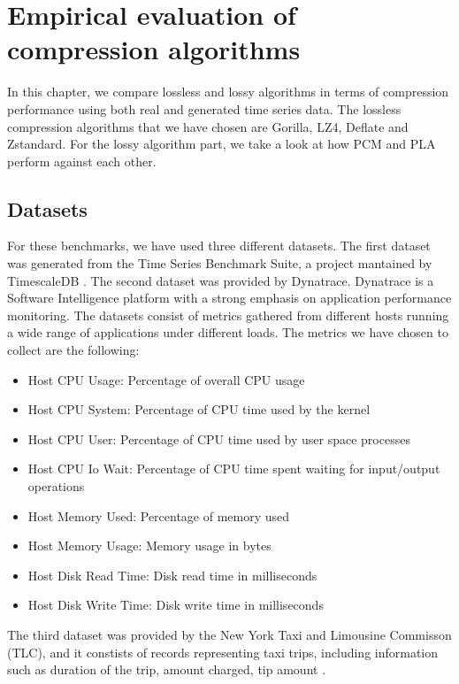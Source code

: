 \chapter{Empirical evaluation of compression algorithms}
In this chapter, we compare lossless and lossy algorithms in terms of compression performance using both real and 
generated time series data. The lossless compression algorithms that we have chosen are Gorilla, LZ4,
Deflate and Zstandard. For the lossy algorithm part, we take a look at how PCM and PLA perform against each other.

\section{Datasets}
For these benchmarks, we have used three different datasets. The first dataset was generated from the
Time Series Benchmark Suite, a project mantained by TimescaleDB \cite{timescale_2019_timescaletsbs}.
The second dataset was provided by Dynatrace. Dynatrace is a Software Intelligence platform with a strong
emphasis on application performance monitoring. The datasets consist of metrics gathered from
different hosts running a wide range of applications under different loads.
The metrics we have chosen to collect are the following:
\begin{itemize}
    \item Host CPU Usage: Percentage of overall CPU usage
    \item Host CPU System: Percentage of CPU time used by the kernel
    \item Host CPU User: Percentage of CPU time used by user space processes
    \item Host CPU Io Wait: Percentage of CPU time spent waiting for input/output operations
    \item Host Memory Used: Percentage of memory used
    \item Host Memory Usage: Memory usage in bytes
    \item Host Disk Read Time: Disk read time in milliseconds
    \item Host Disk Write Time: Disk write time in milliseconds
\end{itemize}
The third dataset was provided by the New York Taxi and Limousine Commisson (TLC), and it constists
of records representing taxi trips, including information such as duration of the trip, amount
charged, tip amount \cite{tlc2019_dataset}.

